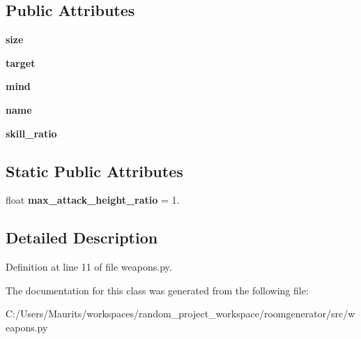 \subsection*{Public Attributes}
\begin{DoxyCompactItemize}
\item 
\hypertarget{classweapons_1_1_fake_body_to_represent_flying_object_a843ef370c2fd9dfd6796628290553bc5}{}{\bfseries size}\label{classweapons_1_1_fake_body_to_represent_flying_object_a843ef370c2fd9dfd6796628290553bc5}

\item 
\hypertarget{classweapons_1_1_fake_body_to_represent_flying_object_a5665cdf1dfcb6e60b0de2734b2d04076}{}{\bfseries target}\label{classweapons_1_1_fake_body_to_represent_flying_object_a5665cdf1dfcb6e60b0de2734b2d04076}

\item 
\hypertarget{classweapons_1_1_fake_body_to_represent_flying_object_a3e3ed3af233d839dcbbbdfdc43365471}{}{\bfseries mind}\label{classweapons_1_1_fake_body_to_represent_flying_object_a3e3ed3af233d839dcbbbdfdc43365471}

\item 
\hypertarget{classweapons_1_1_fake_body_to_represent_flying_object_ac84d5f0ad9d4aba9108f3bb6981b060d}{}{\bfseries name}\label{classweapons_1_1_fake_body_to_represent_flying_object_ac84d5f0ad9d4aba9108f3bb6981b060d}

\item 
\hypertarget{classweapons_1_1_fake_body_to_represent_flying_object_ac7b60aa1b279db94bd4eeb52f5746c31}{}{\bfseries skill\+\_\+ratio}\label{classweapons_1_1_fake_body_to_represent_flying_object_ac7b60aa1b279db94bd4eeb52f5746c31}

\end{DoxyCompactItemize}
\subsection*{Static Public Attributes}
\begin{DoxyCompactItemize}
\item 
\hypertarget{classweapons_1_1_fake_body_to_represent_flying_object_a1841150c2454123a94977480db4c44c3}{}float {\bfseries max\+\_\+attack\+\_\+height\+\_\+ratio} = 1.\label{classweapons_1_1_fake_body_to_represent_flying_object_a1841150c2454123a94977480db4c44c3}

\end{DoxyCompactItemize}


\subsection{Detailed Description}


Definition at line 11 of file weapons.\+py.



The documentation for this class was generated from the following file\+:\begin{DoxyCompactItemize}
\item 
C\+:/\+Users/\+Maurits/workspaces/random\+\_\+project\+\_\+workspace/roomgenerator/src/weapons.\+py\end{DoxyCompactItemize}
